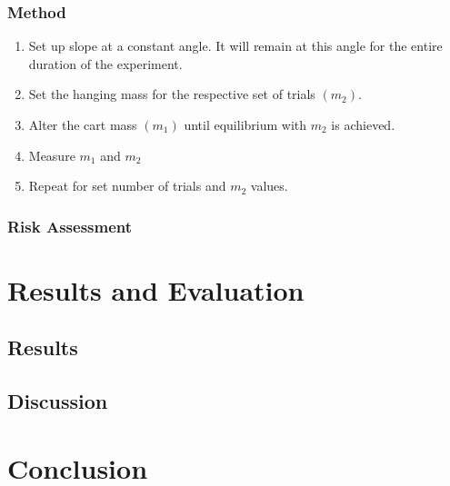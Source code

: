 \documentclass[12pt,a4paper]{article}
\begin{document}
\subsubsection{Method}
\begin{enumerate}
\item Set up slope at a constant angle. It will remain at this angle for the entire duration of the experiment. 
\item Set the hanging mass for the respective set of trials $(m_2)$. 
\item Alter the cart mass $(m_1)$ until equilibrium with $m_2$ is achieved.
\item Measure $m_1$ and $m_2$ 
\item Repeat for set number of trials and $m_2$ values.
	
	 
\end{enumerate}


\subsubsection{Risk Assessment}

\section{Results and Evaluation}
\subsection{Results}
\subsection{Discussion}


\section{Conclusion}

	
	
	
\end{document}
